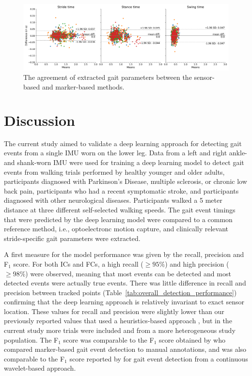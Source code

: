 \documentclass[sensors,article,submit,pdftex,moreauthors]{Definitions/mdpi}
\begin{document}
\begin{figure}[H]
	\centering
	\includegraphics[width=13.5cm]{fig/bland_altman_plots_stride_params.png}
	\caption{The agreement of extracted gait parameters between the sensor-based and marker-based methods.\label{fig:gait_parameters_bland_altman_plots}}
\end{figure}  


\section{Discussion}
The current study aimed to validate a deep learning approach for detecting gait events from a single IMU worn on the lower leg. Data from a left and right ankle- and shank-worn IMU were used for training a deep learning model to detect gait events from walking trials performed by healthy younger and older adults, participants diagnosed with Parkinson's Disease, multiple sclerosis, or chronic low back pain, participants who had a recent symptomatic stroke, and participants diagnosed with other neurological diseases. Participants walked a 5 meter distance at three different self-selected walking speeds. The gait event timings that were predicted by the deep learning model were compared to a common reference method, i.e., optoelectronc motion capture, and clinically relevant stride-specific gait parameters were extracted. 

A first measure for the model performance was given by the recall, precision and F$_{1}$ score. For both ICs and FCs, a high recall ($\ge 95\%$) and high precision ($\ge 98\%$) were observed, meaning that most events can be detected and most detected events were actually true events. There was little difference in recall and precision between tracked points (Table~\ref{tab:overall_detection_performance}) confirming that the deep learning approach is relatively invariant to exact sensor location. These values for recall and precision were slightly lower than our previously reported values \cite{Romijnders2021} that used a heuristics-based approach \cite{Salarian2004}, but in the current study more trials were included and from a more heterogeneous study population. The F$_{1}$ score was comparable to the F$_{1}$ score obtained by \cite{Filtjens2020} who compared marker-based gait event detection to manual annotations, and was also comparable to the F$_{1}$ score reported by \cite{Ji2019} for gait event detection from a continuous wavelet-based approach.
\end{document}
